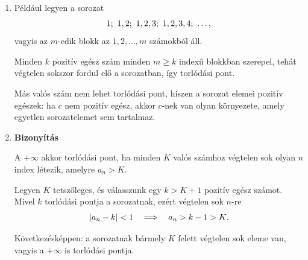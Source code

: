 \documentclass[11pt]{scrartcl}
\begin{document}
\begin{enumerate}
	\item Például legyen a sorozat
	      \[
		      1;\ 1, 2;\ 1, 2, 3;\ 1, 2, 3, 4;\ \ldots
		      \text,
	      \]
	      vagyis az $m$-edik blokk az $1, 2, \ldots, m$ számokból áll.

	      Minden $k$ pozitív egész szám minden $m \ge k$ indexű blokkban
	      szerepel, tehát végtelen sokszor fordul elő a sorozatban, így
	      torlódási pont.

	      Más valós szám nem lehet torlódási pont, hiszen a sorozat elemei
	      pozitív egészek: ha $c$ nem pozitív egész, akkor $c$-nek van olyan
	      környezete, amely egyetlen sorozatelemet sem tartalmaz.

	\item \textbf{Bizonyítás}

	      A $+\infty$ akkor torlódási pont, ha minden $K$ valós számhoz
	      végtelen sok olyan $n$ index létezik, amelyre $a_n > K$.

	      Legyen $K$ tetszőleges, és válasszunk egy $k > K + 1$ pozitív egész
	      számot. Mivel $k$ torlódási pontja a sorozatnak, ezért végtelen sok
	      $n$-re
	      \[
		      |a_n - k| < 1
		      \quad \Longrightarrow \quad
		      a_n > k - 1 > K
		      \text.
	      \]

	      Következésképpen: a sorozatnak bármely $K$ felett végtelen sok eleme
	      van, vagyis a $+\infty$ is torlódási pontja.
\end{enumerate}
\end{document}
